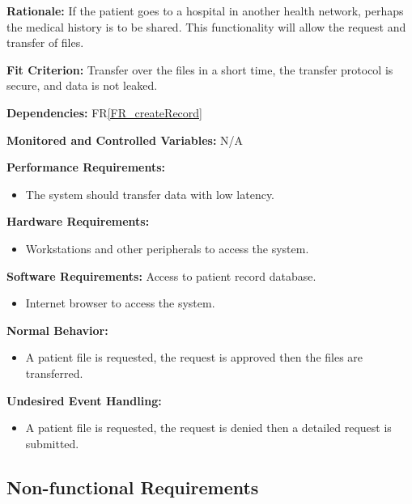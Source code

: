 \documentclass[12pt]{article}
\begin{document}
\begin{itemize}
\textbf{Rationale:} If the patient goes to a hospital in another health network, perhaps the medical history is to be shared. This functionality will allow the request and transfer of files.

\textbf{Fit Criterion:} Transfer over the files in a short time, the transfer protocol is secure, and data is not leaked.

\textbf{Dependencies:} FR\ref{FR_createRecord}

\textbf{Monitored and Controlled Variables:} N/A

\textbf{Performance Requirements:}
\begin{itemize}
  \item The system should transfer data with low latency.
\end{itemize}

\textbf{Hardware Requirements:} 
\begin{itemize}
  \item Workstations and other peripherals to access the system.
\end{itemize}

\textbf{Software Requirements:}
Access to patient record database.
\begin{itemize}
  \item Internet browser to access the system. 
\end{itemize}

\textbf{Normal Behavior:}
\begin{itemize}
  \item A patient file is requested, the request is approved then the files are transferred.
\end{itemize}

\textbf{Undesired Event Handling:}
\begin{itemize}
  \item A patient file is requested, the request is denied then a detailed request is submitted.
\end{itemize}
\end{itemize}


\subsection{Non-functional Requirements} \label{sec_NonFunctionalRequirements}
\end{document}
